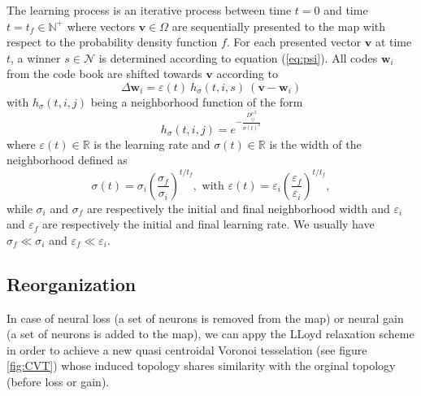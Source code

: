 The learning process is an iterative process between time $t=0$ and time
$t=t_f \in \mathbb{N}^+$ where vectors $\mathbf{v} \in \Omega$ are sequentially
presented to the map with respect to the probability density function $f$. For
each presented vector $\mathbf{v}$ at time $t$, a winner $s \in \mathcal{N}$ is
determined according to equation (\ref{eq:psi}). All codes $\mathbf{w}_{i}$
from the code book are shifted towards $\mathbf{v}$ according to
\begin{equation}
  \Delta\mathbf{w}_{i} = \varepsilon(t)~h_\sigma(t,i,s)~(\mathbf{v} -
  \mathbf{w}_i)
  \label{eq:som-learning}
\end{equation}
with $h_\sigma(t,i,j)$ being a neighborhood function of the form
\begin{equation}
  h_\sigma(t,i,j) = e^{- \frac{{D^p_{ij}}^2}{\sigma(t)^2}}
  \label{eq:som-neighborhood}
\end{equation}
where $\varepsilon(t) \in \mathbb{R}$ is the learning rate and $\sigma(t) \in \mathbb{R}$
is the width of the neighborhood defined as
\begin{equation}
  \sigma(t) =
  \sigma_i\left(\frac{\sigma_f}{\sigma_i}\right)^{t/t_f}, \text{ with } \varepsilon(t) =
  \varepsilon_i\left(\frac{\varepsilon_f}{\varepsilon_i}\right)^{t/t_f},
\end{equation}
while $\sigma_i$ and $\sigma_f$ are respectively the initial and final
neighborhood width and $\varepsilon_i$ and $\varepsilon_f$ are respectively the
initial and final learning rate. We usually have $\sigma_f \ll \sigma_i$ and
$\varepsilon_f \ll \varepsilon_i$.


\subsection{Reorganization}

In case of neural loss (a set of neurons is removed from the map) or neural
gain (a set of neurons is added to the map), we can appy the LLoyd relaxation
scheme in order to achieve a new quasi centroidal Voronoi tesselation (see
figure \ref{fig:CVT}) whose induced topology shares similarity with the orginal
topology (before loss or gain).

